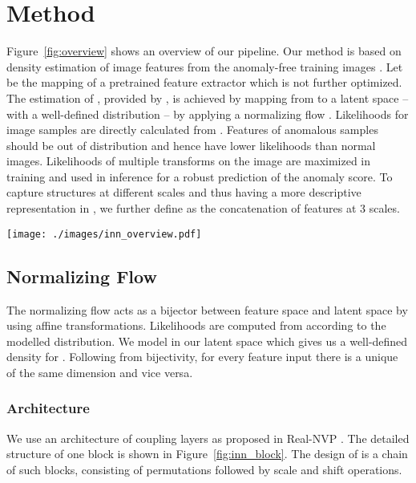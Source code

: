 \documentclass[10pt,twocolumn,letterpaper]{article}
\begin{document}
\section{Method}
\label{method}
Figure~\ref{fig:overview} shows an overview of our pipeline.
Our method is based on density estimation of image features  from the anomaly-free training images .
Let  be the mapping of a pretrained feature extractor which is not further optimized. 
The estimation of , provided by , is achieved by mapping from  to a latent space  -- with a well-defined distribution  -- by applying a normalizing flow .
Likelihoods for image samples are directly calculated from .
Features of anomalous samples should be out of distribution and hence have lower likelihoods than normal images. 
Likelihoods of multiple transforms on the image are maximized in training and used in inference for a robust prediction of the anomaly score.
To capture structures at different scales and thus having a more descriptive representation in , we further define  as the concatenation of features at 3 scales.

\begin{figure*}
\centering
  \texttt{[image: ./images/inn\_overview.pdf]} 
 \caption{Architecture of one block inside the normalizing flow: After a fixed random permutation, the input is split into two parts that regress scale and shift parameters to transform their respective counterpart. Symbols  and  denote element-wise multiplication and addition, respectively. Numerical operations are symbolized by grey blocks. White blocks contain variable names.}
\label{fig:inn_block}
\end{figure*}
\subsection{Normalizing Flow}
\label{normflow}
The normalizing flow acts as a bijector between feature space  and latent space  by using affine transformations.
Likelihoods are computed from  according to the modelled distribution.
We model  in our latent space which gives us a well-defined density  for .
Following from bijectivity, for every feature input there is a unique  of the same dimension and vice versa.

\subsubsection{Architecture}
We use an architecture of coupling layers as proposed in Real-NVP \cite{realnvp}.
The detailed structure of one block is shown in Figure~\ref{fig:inn_block}. The design of  is a chain of such blocks, consisting of permutations followed by scale and shift operations.
\end{document}
